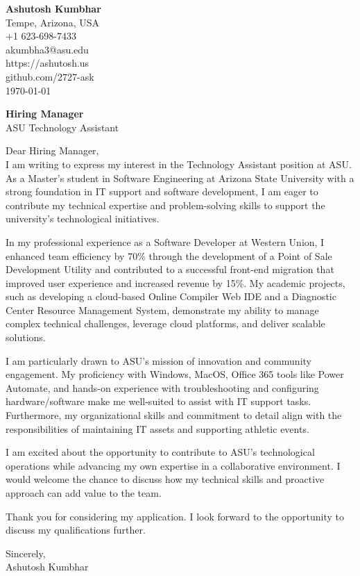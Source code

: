 \documentclass[11pt]{article}
\begin{document}
\begin{flushleft}
\textbf{Ashutosh Kumbhar} \\
Tempe, Arizona, USA \\
+1 623-698-7433 \\
akumbha3@asu.edu \\
https://ashutosh.us \\
github.com/2727-ask \\
\today
\end{flushleft}

\vspace{0.5em}

\textbf{Hiring Manager} \\
ASU Technology Assistant \\

\vspace{1em}

Dear Hiring Manager, \\

I am writing to express my interest in the Technology Assistant position at ASU. As a Master’s student in Software Engineering at Arizona State University with a strong foundation in IT support and software development, I am eager to contribute my technical expertise and problem-solving skills to support the university’s technological initiatives. 

In my professional experience as a Software Developer at Western Union, I enhanced team efficiency by 70\% through the development of a Point of Sale Development Utility and contributed to a successful front-end migration that improved user experience and increased revenue by 15\%. My academic projects, such as developing a cloud-based Online Compiler Web IDE and a Diagnostic Center Resource Management System, demonstrate my ability to manage complex technical challenges, leverage cloud platforms, and deliver scalable solutions. 

I am particularly drawn to ASU’s mission of innovation and community engagement. My proficiency with Windows, MacOS, Office 365 tools like Power Automate, and hands-on experience with troubleshooting and configuring hardware/software make me well-suited to assist with IT support tasks. Furthermore, my organizational skills and commitment to detail align with the responsibilities of maintaining IT assets and supporting athletic events.

I am excited about the opportunity to contribute to ASU's technological operations while advancing my own expertise in a collaborative environment. I would welcome the chance to discuss how my technical skills and proactive approach can add value to the team.

Thank you for considering my application. I look forward to the opportunity to discuss my qualifications further.

Sincerely, \\
Ashutosh Kumbhar
\end{document}
